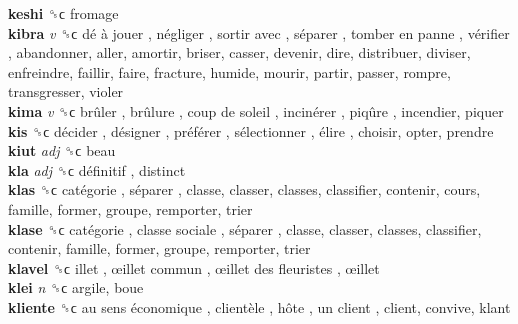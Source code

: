 \textbf{keshi} ␝ϲ  fromage  \\
\textbf{kibra} \emph{v}  ␝ϲ   dé à jouer ,  négliger ,  sortir avec ,  séparer ,  tomber en panne ,  vérifier , abandonner, aller, amortir, briser, casser, devenir, dire, distribuer, diviser, enfreindre, faillir, faire, fracture, humide, mourir, partir, passer, rompre, transgresser, violer  \\
\textbf{kima} \emph{v}  ␝ϲ   brûler ,  brûlure ,  coup de soleil ,  incinérer ,  piqûre , incendier, piquer  \\
\textbf{kis} ␝ϲ   décider ,  désigner ,  préférer ,  sélectionner ,  élire , choisir, opter, prendre  \\
\textbf{kiut} \emph{adj}  ␝ϲ  beau  \\
\textbf{kla} \emph{adj}  ␝ϲ   définitif , distinct  \\
\textbf{klas} ␝ϲ   catégorie ,  séparer , classe, classer, classes, classifier, contenir, cours, famille, former, groupe, remporter, trier  \\
\textbf{klase} ␝ϲ   catégorie ,  classe sociale ,  séparer , classe, classer, classes, classifier, contenir, famille, former, groupe, remporter, trier  \\
\textbf{klavel} ␝ϲ   illet ,  œillet commun ,  œillet des fleuristes ,  œillet   \\
\textbf{klei} \emph{n}  ␝ϲ  argile, boue  \\
\textbf{kliente} ␝ϲ   au sens économique ,  clientèle ,  hôte ,  un client , client, convive, klant  \\
